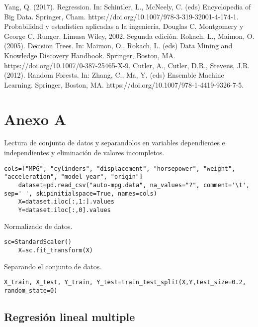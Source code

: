 \documentclass[conference]{IEEEtran}
\begin{document}
\begin{thebibliography}{00}
Yang, Q. (2017). Regression. In: Schintler, L., McNeely, C. (eds) Encyclopedia of Big Data. Springer, Cham. https://doi.org/10.1007/978-3-319-32001-4-174-1.
 Probabilidad y estadística aplicadas a la ingeniería, Douglas C. Montgomery y George C. Runger. Limusa Wiley, 2002. Segunda edición.
 Rokach, L., Maimon, O. (2005). Decision Trees. In: Maimon, O., Rokach, L. (eds) Data Mining and Knowledge Discovery Handbook. Springer, Boston, MA. https://doi.org/10.1007/0-387-25465-X-9.
 Cutler, A., Cutler, D.R., Stevens, J.R. (2012). Random Forests. In: Zhang, C., Ma, Y. (eds) Ensemble Machine Learning. Springer, Boston, MA. https://doi.org/10.1007/978-1-4419-9326-7-5.

\end{thebibliography}

\section{Anexo A}
Lectura de conjunto de datos y separandolos en variables dependientes e independientes y eliminación de valores incompletos.  
\lstset{language=Python, breaklines=true, basicstyle=\footnotesize}
\lstset{numbers=left, numberstyle=\tiny, stepnumber=1, numbersep=-2pt}
\begin{lstlisting}[frame=single]
    cols=["MPG", "cylinders", "displacement", "horsepower", "weight", "acceleration", "model year", "origin"]
    dataset=pd.read_csv("auto-mpg.data", na_values="?", comment='\t', sep=' ', skipinitialspace=True, names=cols)
    X=dataset.iloc[:,1:].values
    Y=dataset.iloc[:,0].values
\end{lstlisting}

Normalizado de datos. 
\begin{lstlisting}[frame=single]
    sc=StandardScaler()
    X=sc.fit_transform(X)
\end{lstlisting}

Separando el conjunto de datos.
\begin{lstlisting}[frame=single]
    X_train, X_test, Y_train, Y_test=train_test_split(X,Y,test_size=0.2, random_state=0)
\end{lstlisting}

\subsection{Regresión lineal multiple}
\end{document}
